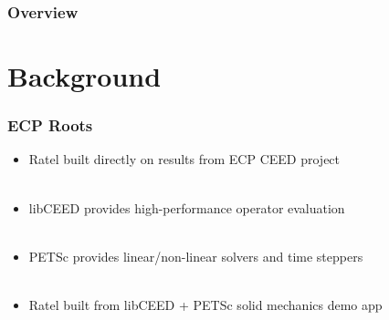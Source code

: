 \documentclass{beamer}
\begin{document}

\begin{frame}
\frametitle{Overview} %
\tableofcontents %
\end{frame}

\section{Background}

\begin{frame}
\begin{center}
\frametitle{ECP Roots}

\begin{itemize}

\item Ratel built directly on results from ECP CEED project\\

~\\

\item libCEED provides high-performance operator evaluation\\

~\\

\item PETSc provides linear/non-linear solvers and time steppers\\

~\\

\item Ratel built from libCEED + PETSc solid mechanics demo app\\

\end{itemize}

\end{center}
\end{frame}
\end{document}
